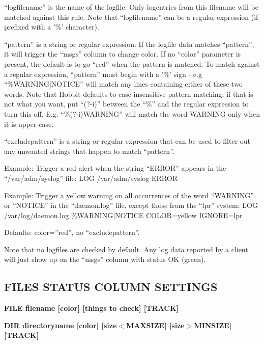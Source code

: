   ``logfilename'' is the name of the logfile. Only logentries from this filename will be matched against this rule. Note that ``logfilename'' can be a regular expression (if prefixed with a '\%' character). 


  ``pattern'' is a string or regular expression. If the logfile data matches ``pattern'', it will trigger the ``msgs'' column to change color. If no ``color'' parameter is present, the default is to go ``red'' when the pattern is matched. To match against a regular expression, ``pattern'' must begin with a '\%' sign - e.g ``\%WARNING|NOTICE'' will match any lines containing either of these two words. Note that Hobbit defaults to case-insensitive pattern matching; if that is not what you want, put ``(?-i)'' between the ``\%'' and the regular expression to turn this off. E.g. ``\%(?-i)WARNING'' will match the word WARNING only when it is upper-case. 


  ``excludepattern'' is a string or regular expression that can be used to filter out any unwanted strings that happen to match ``pattern''. 


  Example: Trigger a red alert when the string ``ERROR'' appears in the ``/var/adm/syslog'' file:  
LOG /var/adm/syslog ERROR 



  Example: Trigger a yellow warning on all occurrences of the word ``WARNING'' or ``NOTICE'' in the ``daemon.log'' file, except those from the ``lpr'' system:  
LOG /var/log/daemon.log \%WARNING|NOTICE COLOR=yellow IGNORE=lpr 



  Defaults:  
color=''red'', no ``excludepattern''. 



  Note that no logfiles are checked by default. Any log data reported by a client will just show up on the ``msgs'' column with status OK (green). 


 


 
\subsection{FILES STATUS COLUMN SETTINGS}


 \textbf{FILE filename [color] [things to check] [TRACK]}



 \textbf{DIR directoryname [color] [size$<$MAXSIZE] [size$>$MINSIZE] [TRACK]}




